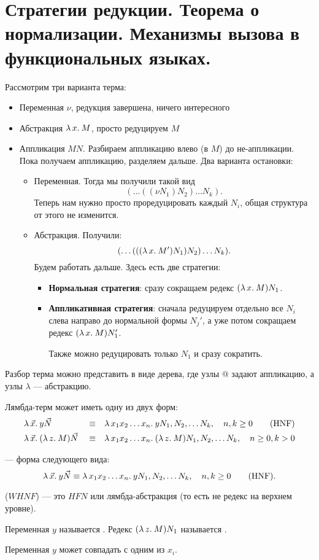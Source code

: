 \documentclass[11pt,a4paper]{article}
\begin{document}
\section{Стратегии редукции. Теорема о нормализации. Механизмы вызова в функциональных языках.}
Рассмотрим три варианта терма:
\begin{itemize}
	\item Переменная $ \nu $, редукция завершена, ничего интересного
	\item Абстракция $ \lambda\,{x}.\:{M}$, просто редуцируем $ M$
	\item Аппликация  $ MN$. Разбираем аппликацию влево  (в $ M$) до не-аппликации. Пока получаем аппликацию, разделяем дальше.
		Два варианта остановки:
		\begin{itemize}
			\item Переменная.  Тогда мы получили такой вид
				\[
					(\ldots (( \nu N_1)N_2) \ldots N_k)
				.\] 
				Теперь нам нужно просто проредуцировать каждый $ N_i$, общая структура от этого не изменится. 
			\item Абстракция. Получили:
				\[
					(\ldots (((\lambda\,{x}.\:{M'})N_1)N_2)\ldots N_k)
				.\] 
				Будем работать дальше.
				Здесь есть две стратегии:
				\begin{itemize}
					\item \textbf{Нормальная стратегия}: сразу сокращаем редекс $ (\lambda\,{x}.\:{M})N_1$.
					\item \textbf{Аппликативная стратегия}: сначала редуцируем отдельно все $ N_i$ слева направо до нормальной формы $ N_j'$, а уже потом сокращаем редекс $ (\lambda\,{x}.\:{M})N_1'$.

						Также можно редуцировать только $ N_1$ и сразу сократить.
				\end{itemize}
		\end{itemize}
\end{itemize}
Разбор терма можно представить в виде дерева, где узлы $ @$ задают аппликацию, а узлы $ \lambda$ --- абстракцию.
\begin{thm}
    Лямбда-терм может иметь одну из двух форм:
	\begin{align*}
		&\lambda\,{\vec{x}}.\:{y\vec{N}} &&\equiv&& \lambda\,{x_1 x_2 \ldots x_n }.\:{y N_1, N_2, \ldots N_k}, \quad n,k \ge 0 \tag{HNF} \\
		&\lambda\,{\vec{x}}.\:{(\lambda\,{z}.\:{M})\vec{N}} &&\equiv&& \lambda\,{x_1 x_2 \ldots x_n }.\:{(\lambda\,{z}.\:{M}) N_1, N_2, \ldots N_k}, \quad n \ge 0, k >0 
	\end{align*}
\end{thm}
\begin{defn}
	 --- форма следующего вида:
	\[
		\lambda\,{\vec{x}}.\:{y\vec{N}} \equiv \lambda\,{x_1 x_2 \ldots x_n }.\:{y N_1, N_2, \ldots N_k}, \quad n,k \ge 0 \tag{HNF}
	.\] 

	\noindent
	 ($ WHNF$) --- это  $ HFN$ или лямбда-абстракция (то есть не редекс на верхнем уровне). 

	\noindent
	Переменная $ y$ называется .
	Редекс $ (\lambda\,{z}.\:{M})N_1$ называется .
\end{defn}
Переменная $ y $ может совпадать с одним из $ x_i$.
\end{document}
